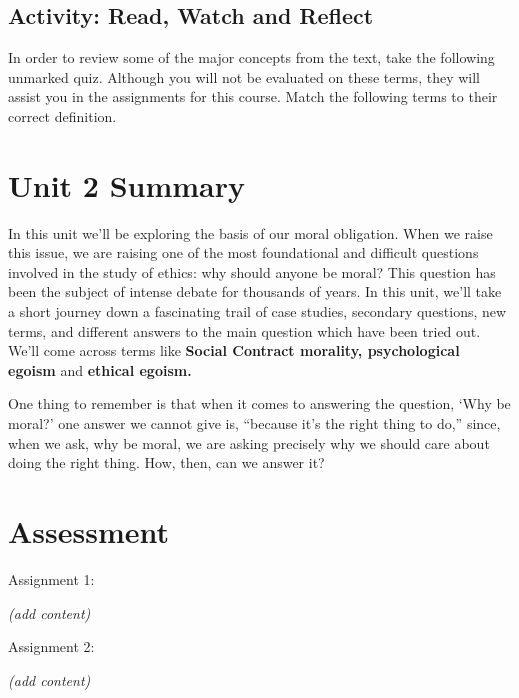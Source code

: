 \documentclass[
]{book}
\begin{document}
\hypertarget{activity-read-watch-and-reflect-5}{%
\subsection*{Activity: Read, Watch and Reflect}\label{activity-read-watch-and-reflect-5}}

\begin{reflect}
In order to review some of the major concepts from the text, take the following unmarked quiz. Although you will not be evaluated on these terms, they will assist you in the assignments for this course. Match the following terms to their correct definition.
\end{reflect}

\hypertarget{unit-2-summary}{%
\section*{Unit 2 Summary}\label{unit-2-summary}}

In this unit we'll be exploring the basis of our moral obligation. When we raise this issue, we are raising one of the most foundational and difficult questions involved in the study of ethics: why should anyone be moral? This question has been the subject of intense debate for thousands of years. In this unit, we'll take a short journey down a fascinating trail of case studies, secondary questions, new terms, and different answers to the main question which have been tried out. We'll come across terms like \textbf{Social Contract morality, psychological egoism} and \textbf{ethical egoism.}

One thing to remember is that when it comes to answering the question, `Why be moral?' one answer we cannot give is, ``because it's the right thing to do,'' since, when we ask, why be moral, we are asking precisely why we should care about doing the right thing. How, then, can we answer it?

\hypertarget{assessment-3}{%
\section*{Assessment}\label{assessment-3}}

\begin{assessment}
{Assignment 1:}

\emph{(add content)}

{Assignment 2:}

\emph{(add content)}
\end{assessment}
\end{document}
